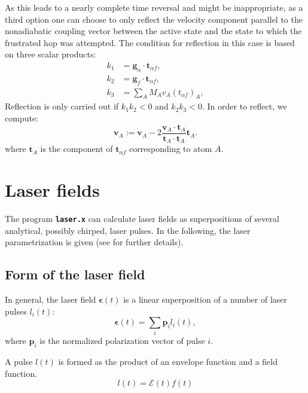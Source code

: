 \documentclass[a4paper,10pt,DIV=15,openany,twoside=false]{scrbook}
\newcommand{\ttt}[1]{\textbf{\texttt{#1}}}
\newcommand{\VEC}[1]{\ensuremath{\mathbf{#1}}}
\begin{document}
As this leads to a nearly complete time reversal and might be inappropriate, as a third option one can choose to only reflect the velocity component parallel to the nonadiabatic coupling vector between the active state and the state to which the frustrated hop was attempted.
The condition for reflection in this case is based on three scalar products:
\begin{align}
  k_1&=\VEC{g}_\alpha\cdot \VEC{t}_{\alpha f},\\
  k_2&=\VEC{g}_f\cdot \VEC{t}_{\alpha f},\\
  k_3&=\sum_A M_Av_A(t_{\alpha f})_A,
\end{align}
Reflection is only carried out if $k_1k_2<0$ and $k_2k_3<0$.
In order to reflect, we compute:
\begin{equation}
  \VEC{v}_A:=\VEC{v}_A-2\frac{\VEC{v}_A\cdot\VEC{t}_A}{\VEC{t}_A\cdot\VEC{t}_A}\VEC{t}_A.
\end{equation}
where $\VEC{t}_A$ is the component of $\VEC{t}_{\alpha f}$ corresponding to atom $A$.




\section{Laser fields}\label{met:laser_field}

The program \ttt{laser.x} can calculate laser fields as superpositions of several analytical, possibly chirped, laser pulses. In the following, the laser parametrization is given (see \cite{Marquetand2007} for further details).

\subsection{Form of the laser field}

In general, the laser field $\boldsymbol{\epsilon}(t)$ is a linear superposition of a number of laser pulses $l_i(t)$:
\begin{equation}
  \boldsymbol{\epsilon}(t)=\sum\limits_i \VEC{p}_il_i(t),
\end{equation}
where $\VEC{p}_i$ is the normalized polarization vector of pulse $i$.

A pulse $l(t)$ is formed as the product of an envelope function and a field function. 
\begin{equation}
  l(t)=\mathcal{E}(t)f(t)
\end{equation}
\end{document}
